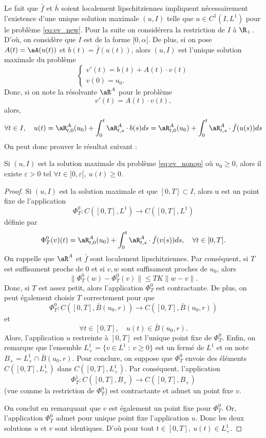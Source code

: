 Le fait que $\bar f$ et $\bar h$ soient localement lipschitziennes impliquent nécessairement l'existence d'une unique solution maximale
$(u,I)$ telle que $u \in C^1(I, L^1)$ pour le problème \ref{eq:ev_new}. Pour la suite on considérera la restriction de $I$ à $\R_+$. D'où, on considère que $I$ est de la forme $[0, \alpha[$.
De plus, si on pose $A(t) = \aA(u(t))$ et $b(t) = \bar f (u(t))$, alors
$(u,I)$ est l'unique solution maximale du problème
\begin{equation}
	\begin{cases}
		v'(t) = b(t) + A(t) \cdot v(t) \\
		v(0) = u_0.
	\end{cases}
	\label{eq:ev_lin}
\end{equation}
Donc, si on note la résolvante $\aR^A$ pour le problème
\[
	v'(t) = A(t) \cdot v(t),
\]
alors,
\[
	\forall t \in I, \quad u(t) = \aR^A_{t,0}(u_0) + \int_{0}^t \aR^A_{t,s} \cdot b(s) ds
	= \aR^A_{t,0}(u_0) + \int_{0}^t \aR^A_{t,s} \cdot \bar f (u(s)) ds
\]
On peut donc prouver le résultat suivant :

\begin{prop}{}{}
	Si $(u, I)$ est la solution maximale du problème \ref{eq:ev_nonop} où $u_0 \ge 0$, alors il existe $\varepsilon > 0$ tel $\forall t \in [0,\varepsilon[, \ u(t) \ge 0$.
\end{prop}

\begin{proof}
	Si $(u, I)$ est la solution maximale et que $[0,T] \subset I$, alors u est un point fixe de l'application
	\[
		\Phi_T^0 : C([0,T], L^1) \to C([0,T], L^1)
	\]
	définie par
	\[
		\Phi_T^0(v)(t) = \aR^A_{t,0}(u_0) + \int_{0}^t \aR^A_{t,s} \cdot \bar f (v(s)) ds, \quad \forall t \in [0,T].
	\]
	On rappelle que $\aR^A$ et $\bar f$ sont localement lipschitziennes. Par conséquent, si $T$ est suffisament proche de $0$ et si $v, w$ sont suffisament proches de $u_0$, alors
	\[
		\|\Phi_T^0(w) -
		\Phi_T^0(v)\| \le T K \|w-v\|.
	\]
	Donc, si $T$ est assez petit, alors l'application $\Phi_T^0$ est contractante. De plus, on peut également choisir $T$ correctement pour que
	\[
		\Phi_T^0 : C([0,T], \bar{B}(u_0, r)) \to C([0,T], \bar{B}(u_0, r))
	\]
	et
	\[
		\forall t \in [0,T], \quad u(t) \in  \bar{B}(u_0, r).
	\]
	Alors, l'application $u$ restreinte à $[0,T]$ est l'unique point fixe de $\Phi_T^0$.
	Enfin, on remarque que l'ensemble $L^1_+ = \{v \in L^1 \ : \ v \ge 0\}$ est un fermé de $L^1$ et on note $B_+ = L^1_+ \cap \bar{B}(u_0, r)$.
	Pour conclure, on suppose que $\Phi_T^0$ envoie des éléments $C([0,T], L^1_+)$ dans $C([0,T], L^1_+)$. Par conséquent, l'application
	\[
		\Phi_T^1 : C([0,T], B_+) \to C([0,T], B_+)
	\]
	(vue comme la restriction de $\Phi_T^0$) est contractante et admet un point fixe $v$.

	\medskip

	On conclut en remarquant que $v$ est également un point fixe pour $\Phi_T^0$.
	Or, l'application $\Phi_T^0$ admet pour unique point fixe l'application $u$. Donc les deux solutions $u$ et $v$ sont identiques. D'où pour tout $t \in [0,T], \ u(t) \in L^1_+$.
\end{proof}

